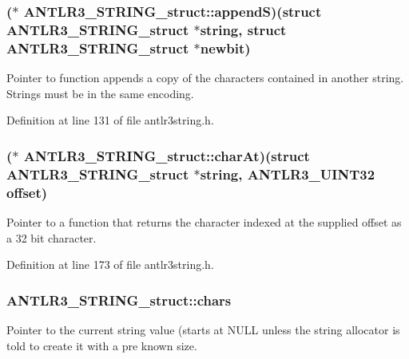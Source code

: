 \hypertarget{struct_a_n_t_l_r3___s_t_r_i_n_g__struct_a22dfad5a291577c40da7adb57ea2f6a2}{
\subsubsection[{append\-S}]{($\ast$ A\-N\-T\-L\-R3\-\_\-\-S\-T\-R\-I\-N\-G\-\_\-struct\-::append\-S)(struct {\bf A\-N\-T\-L\-R3\-\_\-\-S\-T\-R\-I\-N\-G\-\_\-struct} $\ast$string, struct {\bf A\-N\-T\-L\-R3\-\_\-\-S\-T\-R\-I\-N\-G\-\_\-struct} $\ast$newbit)}}\label{struct_a_n_t_l_r3___s_t_r_i_n_g__struct_a22dfad5a291577c40da7adb57ea2f6a2}
Pointer to function appends a copy of the characters contained in another string. Strings must be in the same encoding. 

Definition at line 131 of file antlr3string.\-h.

\hypertarget{struct_a_n_t_l_r3___s_t_r_i_n_g__struct_a28a8d25f91f1285dfbb9e13ab9bfef50}{
\subsubsection[{char\-At}]{($\ast$ A\-N\-T\-L\-R3\-\_\-\-S\-T\-R\-I\-N\-G\-\_\-struct\-::char\-At)(struct {\bf A\-N\-T\-L\-R3\-\_\-\-S\-T\-R\-I\-N\-G\-\_\-struct} $\ast$string, {\bf A\-N\-T\-L\-R3\-\_\-\-U\-I\-N\-T32} {\bf offset})}}\label{struct_a_n_t_l_r3___s_t_r_i_n_g__struct_a28a8d25f91f1285dfbb9e13ab9bfef50}
Pointer to a function that returns the character indexed at the supplied offset as a 32 bit character. 

Definition at line 173 of file antlr3string.\-h.

\hypertarget{struct_a_n_t_l_r3___s_t_r_i_n_g__struct_a7be84d1554437ab99377ab3c623ebd24}{
\subsubsection[{chars}]{ A\-N\-T\-L\-R3\-\_\-\-S\-T\-R\-I\-N\-G\-\_\-struct\-::chars}}\label{struct_a_n_t_l_r3___s_t_r_i_n_g__struct_a7be84d1554437ab99377ab3c623ebd24}
Pointer to the current string value (starts at N\-U\-L\-L unless the string allocator is told to create it with a pre known size. 

